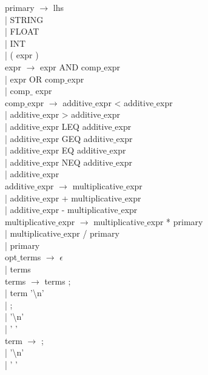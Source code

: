 \documentclass{article}
\begin{document}
\noindent primary $\rightarrow$ lhs \\
| STRING \\
| FLOAT \\
| INT \\
| ( expr ) \\

\noindent expr $\rightarrow$ expr AND comp$\_$expr \\
| expr OR comp$\_$expr \\
| comp$\_$ expr \\

\noindent comp$\_$expr $\rightarrow$ additive$\_$expr < additive$\_$expr \\
| additive$\_$expr > additive$\_$expr \\  
| additive$\_$expr LEQ additive$\_$expr \\  
| additive$\_$expr GEQ additive$\_$expr \\  
| additive$\_$expr EQ additive$\_$expr \\  
| additive$\_$expr NEQ additive$\_$expr \\  
| additive$\_$expr  \\

\noindent additive$\_$expr $\rightarrow$  multiplicative$\_$expr \\ 
| additive$\_$expr + multiplicative$\_$expr \\
| additive$\_$expr - multiplicative$\_$expr \\

\noindent multiplicative$\_$expr $\rightarrow$ multiplicative$\_$expr * primary \\
| multiplicative$\_$expr / primary \\
| primary \\

\noindent opt$\_$terms $\rightarrow$ $\epsilon$ \\
| terms		\\

\noindent terms $\rightarrow$ terms ; \\
| term '\textbackslash n' \\
| ; \\
| '\textbackslash n'	\\	
| ' '\\

\noindent term $\rightarrow$ ; \\
| '\textbackslash n' \\
| ' ' \\
\end{document}
